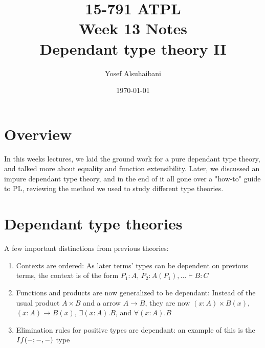 \documentclass[11pt]{article}
\title{15-791 ATPL \\ Week 13 Notes \\ Dependant type theory II}
\author{Yosef Alsuhaibani}
\date{\today}
\begin{document}
\maketitle{}
\section*{Overview}
In this weeks lectures, we laid the ground work for a pure dependant type theory, and talked more about equality and function extensibility. Later, we discussed an impure dependant type theory, and in the end of it all gone over a "how-to" guide to PL, reviewing the method we used to study different type theories. 

\section*{Dependant type theories}
A few important distinctions from previous theories:
\begin{enumerate}
    \item Contexts are ordered: As later terms' types can be dependent on previous terms, the context is of the form $P_1 : A,\, P_2 : A(P_1), \dots \vdash B : C$
    \item Functions and products are now generalized to be dependant: Instead of the usual product $A \times B$ and a arrow $A \xrightarrow{} B$, they are now $(x : A) \times B(x)$, $(x : A) \xrightarrow{} B(x)$, $\exists (x : A). B$, and $\forall (x : A). B$
    \item Elimination rules for positive types are dependant: an example of this is the $If(\--;\--,\--)$ type
    \end{enumerate}
\end{document}
